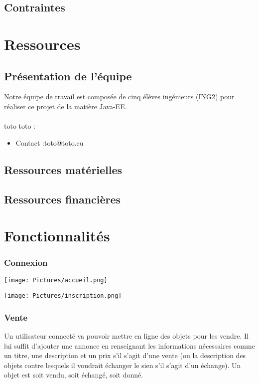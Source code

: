 \documentclass[12pt]{report}
\begin{document}
\subsection{Contraintes}


\newpage
\section{Ressources}

\subsection*{Présentation de l'équipe}
	Notre équipe de travail est composée de cinq élèves ingénieurs (ING2) pour réaliser ce projet de la matière Java-EE. 
\\
\\
\noindent toto toto :
		\begin{itemize}
			\item Contact :\textcolor{mail}{toto@toto.eu}
			\\
		\end{itemize} 
	

\subsection*{Ressources matérielles}


\subsection*{Ressources financières}


\newpage
\section{Fonctionnalités}

\subsubsection*{Connexion}

\begin{center}
		\texttt{[image: Pictures/accueil.png]}
\end{center}

\begin{center}
		\texttt{[image: Pictures/inscription.png]}
\end{center}

\subsubsection*{Vente}
Un utilisateur connecté va pouvoir mettre en ligne des objets pour les vendre. Il lui suffit d'ajouter une annonce en renseignant les informations nécessaires comme un titre, une description et un prix s'il s'agit d'une vente (ou la description des objets contre lesquels il voudrait échanger le sien s'il s'agit d'un échange). Un objet est soit vendu, soit échangé, soit donné.\\
\end{document}
